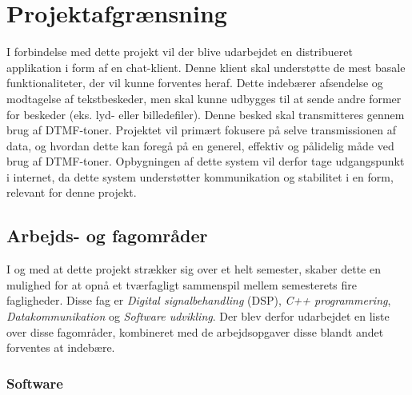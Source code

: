\section{Projektafgrænsning}
I forbindelse med dette projekt vil der blive udarbejdet en distribueret applikation i form af en chat-klient. Denne klient skal understøtte de mest basale funktionaliteter, der vil kunne forventes heraf. Dette indebærer afsendelse og modtagelse af tekstbeskeder, men skal kunne udbygges til at sende andre former for beskeder (eks. lyd- eller billedefiler). Denne besked skal transmitteres gennem brug af DTMF-toner. 
Projektet vil primært fokusere på selve transmissionen af data, og hvordan dette kan foregå på en generel, effektiv og pålidelig måde ved brug af DTMF-toner. Opbygningen af dette system vil derfor tage udgangspunkt i internet, da dette system understøtter kommunikation og stabilitet i en form, relevant for denne projekt. 



\subsection{Arbejds- og fagområder}

I og med at dette projekt strækker sig over et helt semester, skaber dette en mulighed for at opnå et tværfagligt sammenspil mellem semesterets fire fagligheder. Disse fag er \textit{Digital signalbehandling} (DSP), \textit{ C++ programmering}, \textit{Datakommunikation} og \textit{Software udvikling}. Der blev derfor udarbejdet en liste over disse fagområder, kombineret med de arbejdsopgaver disse blandt andet forventes at indebære.   


\subsubsection{Software}

